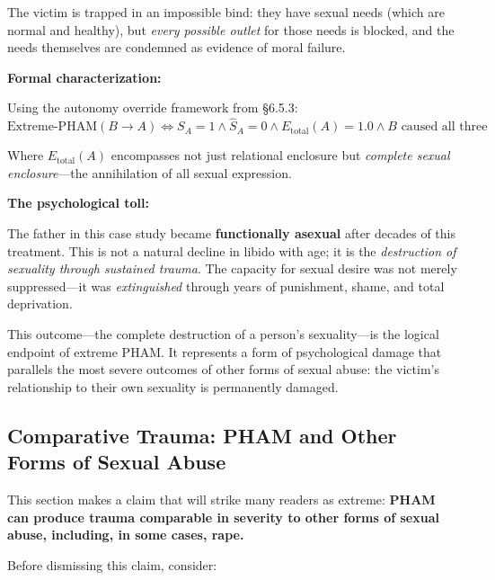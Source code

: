 \documentclass[12pt,openany]{book}
\numberwithin{equation}{chapter}
\begin{document}
The victim is trapped in an impossible bind: they have sexual needs (which are normal and healthy), but \textit{every possible outlet} for those needs is blocked, and the needs themselves are condemned as evidence of moral failure.

\textbf{Formal characterization:}

Using the autonomy override framework from \S 6.5.3:
\[
\text{Extreme-PHAM}(B \rightarrow A) \iff S_A = 1 \land \hat{S}_A = 0 \land E_{\text{total}}(A) = 1.0 \land B \text{ caused all three}
\]

Where $E_{\text{total}}(A)$ encompasses not just relational enclosure but \textit{complete sexual enclosure}---the annihilation of all sexual expression.

\textbf{The psychological toll:}

The father in this case study became \textbf{functionally asexual} after decades of this treatment. This is not a natural decline in libido with age; it is the \textit{destruction of sexuality through sustained trauma}. The capacity for sexual desire was not merely suppressed---it was \textit{extinguished} through years of punishment, shame, and total deprivation.

This outcome---the complete destruction of a person's sexuality---is the logical endpoint of extreme PHAM. It represents a form of psychological damage that parallels the most severe outcomes of other forms of sexual abuse: the victim's relationship to their own sexuality is permanently damaged.

\subsection{Comparative Trauma: PHAM and Other Forms of Sexual Abuse}

This section makes a claim that will strike many readers as extreme: \textbf{PHAM can produce trauma comparable in severity to other forms of sexual abuse, including, in some cases, rape.}

Before dismissing this claim, consider:
\end{document}
